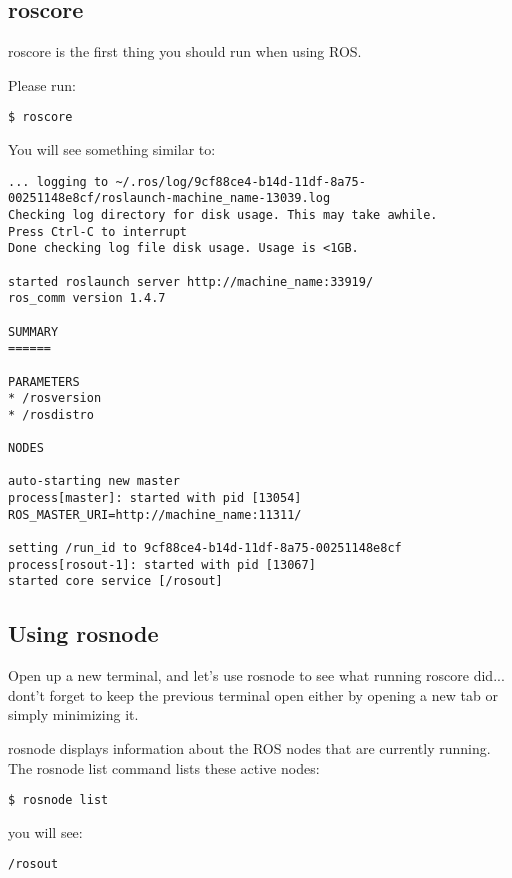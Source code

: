 \subsection{roscore}

roscore is the first thing you should run when using ROS.

Please run:
\begin{lstlisting}[breaklines=true languages=bash]
$ roscore
\end{lstlisting}

You will see something similar to:

\begin{lstlisting}[breaklines=true languages=bash]
... logging to ~/.ros/log/9cf88ce4-b14d-11df-8a75-00251148e8cf/roslaunch-machine_name-13039.log
Checking log directory for disk usage. This may take awhile.
Press Ctrl-C to interrupt
Done checking log file disk usage. Usage is <1GB.

started roslaunch server http://machine_name:33919/
ros_comm version 1.4.7

SUMMARY
======

PARAMETERS
* /rosversion
* /rosdistro

NODES

auto-starting new master
process[master]: started with pid [13054]
ROS_MASTER_URI=http://machine_name:11311/

setting /run_id to 9cf88ce4-b14d-11df-8a75-00251148e8cf
process[rosout-1]: started with pid [13067]
started core service [/rosout]
\end{lstlisting}

\subsection{Using rosnode}
Open up a new terminal, and let's use rosnode to see what running roscore did... dont't forget to keep the previous terminal open either by opening a new tab or simply minimizing it.

rosnode displays information about the ROS nodes that are currently running. The rosnode list command lists these active nodes:

\begin{lstlisting}[breaklines=true languages=bash]
$ rosnode list
\end{lstlisting}

you will see:
\begin{lstlisting}[breaklines=true languages=bash]
/rosout
\end{lstlisting}

